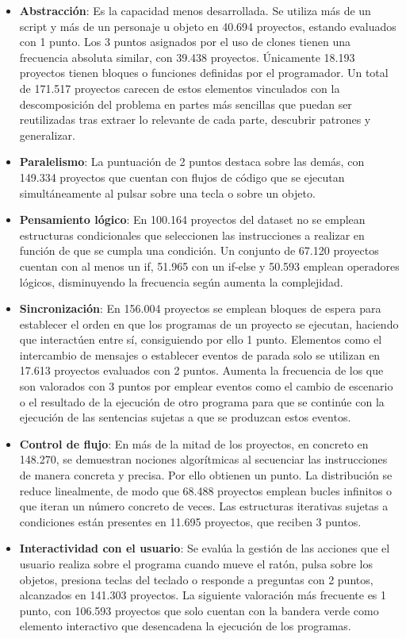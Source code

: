 \documentclass[a4paper, 12pt]{book}
\begin{document}
\begin{itemize}    
    \item \textbf{Abstracción}: Es la capacidad menos desarrollada. Se utiliza más de un script y más de un personaje u objeto en 40.694 proyectos, estando evaluados con 1 punto. Los 3 puntos asignados por el uso de clones tienen una frecuencia absoluta similar, con 39.438 proyectos. Únicamente 18.193 proyectos tienen bloques o funciones definidas por el programador. Un total de 171.517 proyectos carecen de estos elementos vinculados con la descomposición del problema en partes más sencillas que puedan ser reutilizadas tras extraer lo relevante de cada parte, descubrir patrones y generalizar.    
    \item \textbf{Paralelismo}: La puntuación de 2 puntos destaca sobre las demás, con 149.334 proyectos que cuentan con flujos de código que se ejecutan simultáneamente al pulsar sobre una tecla o sobre un objeto.    
    \item \textbf{Pensamiento lógico}: En 100.164 proyectos del dataset no se emplean estructuras condicionales que seleccionen las instrucciones a realizar en función de que se cumpla una condición. Un conjunto de 67.120 proyectos cuentan con al menos un if, 51.965 con un if-else y 50.593 emplean operadores lógicos, disminuyendo la frecuencia según aumenta la complejidad.    
    \item \textbf{Sincronización}: En 156.004 proyectos se emplean bloques de espera para establecer el orden en que los programas de un proyecto se ejecutan, haciendo que interactúen entre sí, consiguiendo por ello 1 punto. Elementos como el intercambio de mensajes o establecer eventos de parada solo se utilizan en 17.613 proyectos evaluados con 2 puntos. Aumenta la frecuencia de los que son valorados con 3 puntos por emplear eventos como el cambio de escenario o el resultado de la ejecución de otro programa para que se continúe con la ejecución de las sentencias sujetas a que se produzcan estos eventos.    
    \item \textbf{Control de flujo}: En más de la mitad de los proyectos, en concreto en 148.270, se demuestran nociones algorítmicas al secuenciar las instrucciones de manera concreta y precisa. Por ello obtienen un punto. La distribución se reduce linealmente, de modo que 68.488 proyectos emplean bucles infinitos o que iteran un número concreto de veces. Las estructuras iterativas sujetas a condiciones están presentes en 11.695 proyectos, que reciben 3 puntos.  
    \item \textbf{Interactividad con el usuario}: Se evalúa la gestión de las acciones que el usuario realiza sobre el programa cuando mueve el ratón, pulsa sobre los objetos, presiona teclas del teclado o responde a preguntas con 2 puntos, alcanzados en 141.303 proyectos. La siguiente valoración más frecuente es 1 punto, con 106.593 proyectos que solo cuentan con la bandera verde como elemento interactivo que desencadena la ejecución de los programas.    

\end{itemize}
\end{document}
